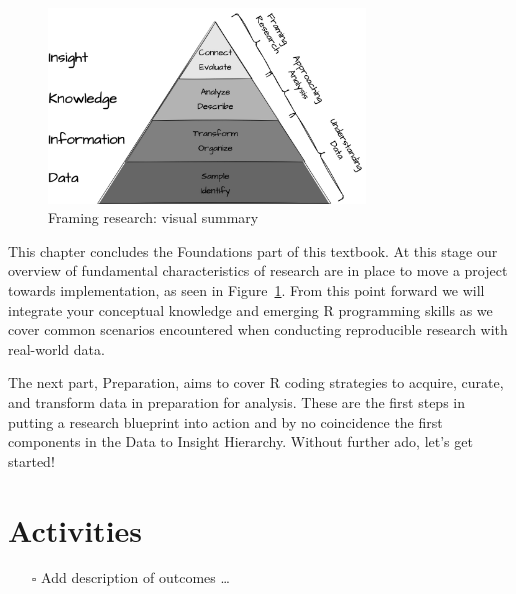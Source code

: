\documentclass[
  letterpaper,
  DIV=11,
  numbers=noendperiod]{scrreport}
\providecommand{\tightlist}{%
  \setlength{\itemsep}{0pt}\setlength{\parskip}{0pt}}\usepackage{longtable,booktabs,array}
\theoremstyle{definition}
\theoremstyle{remark}
\begin{document}
\begin{figure}[H]

{\centering \includegraphics[width=0.75\textwidth,height=\textheight]{figures/framing-research/fr-diki.drawio.png}

}

\caption{\label{fig-fr-visual-summary}Framing research: visual summary}

\end{figure}

This chapter concludes the Foundations part of this textbook. At this
stage our overview of fundamental characteristics of research are in
place to move a project towards implementation, as seen in
Figure~\ref{fig-fr-visual-summary}. From this point forward we will
integrate your conceptual knowledge and emerging R programming skills as
we cover common scenarios encountered when conducting reproducible
research with real-world data.

The next part, Preparation, aims to cover R coding strategies to
acquire, curate, and transform data in preparation for analysis. These
are the first steps in putting a research blueprint into action and by
no coincidence the first components in the Data to Insight Hierarchy.
Without further ado, let's get started!

\hypertarget{activities-2}{%
\section*{Activities}\label{activities-2}}


\begin{itemize}
\tightlist
\item[$\square$]
   Add description of outcomes \ldots{}
\end{itemize}
\end{document}
